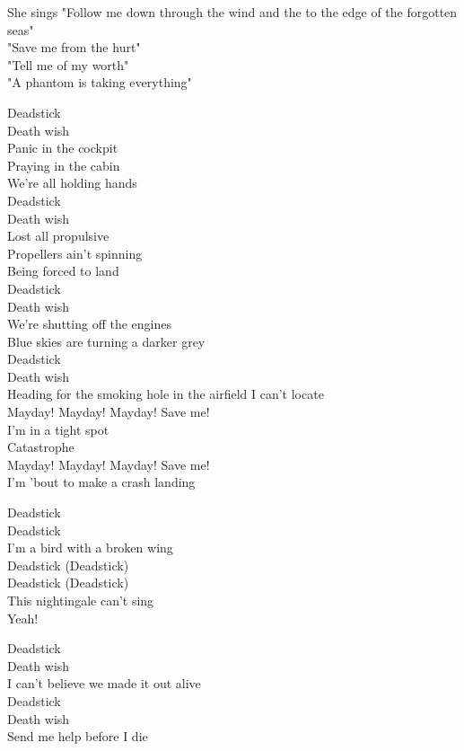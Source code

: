 She sings "Follow me down through the wind and the  to the edge of the forgotten seas" \\
"Save me from the hurt" \\
"Tell me of my worth" \\
"A phantom is taking everything" \\


Deadstick \\
Death wish \\
Panic in the cockpit \\
Praying in the cabin \\
We're all holding hands \\
Deadstick \\
Death wish \\
Lost all propulsive \\
Propellers ain't spinning \\
Being forced to land \\
Deadstick \\
Death wish \\
We're shutting off the engines \\
Blue skies are turning a darker grey \\
Deadstick \\
Death wish \\
Heading for the smoking hole in the airfield I can't locate \\

Mayday! Mayday! Mayday! Save me! \\
I'm in a tight spot \\
Catastrophe \\
Mayday! Mayday! Mayday! Save me! \\
I'm 'bout to make a crash landing \\


Deadstick \\
Deadstick \\
I'm a bird with a broken wing \\
Deadstick (Deadstick) \\
Deadstick (Deadstick) \\
This nightingale can't sing \\
Yeah! \\


Deadstick \\
Death wish \\
I can't believe we made it out alive \\
Deadstick \\
Death wish \\
Send me help before I die \\

